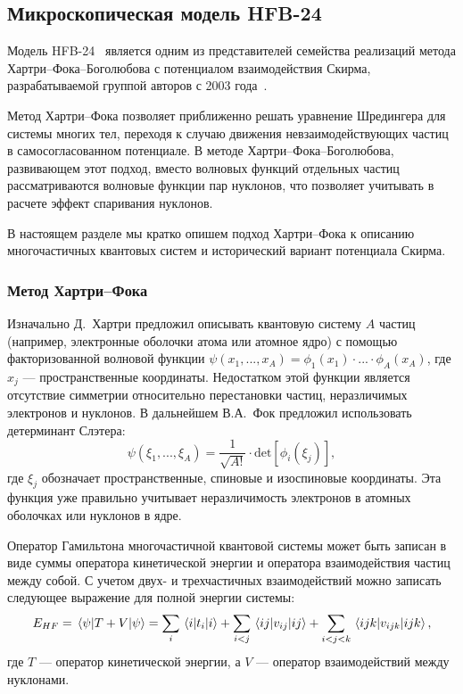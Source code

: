 \subsection{Микроскопическая модель HFB-24}
Модель HFB-24~\cite{goriely2013} является одним из представителей семейства реализаций метода Хартри--Фока--Боголюбова с потенциалом взаимодействия Скирма, разрабатываемой группой авторов с 2003 года~\cite{samyn2003}. 

Метод Хартри--Фока позволяет приближенно решать уравнение Шредингера для системы многих тел, переходя к случаю движения невзаимодействующих частиц в самосогласованном потенциале. В методе Хартри--Фока--Боголюбова, развивающем этот подход, вместо волновых функций отдельных частиц рассматриваются волновые функции пар нуклонов, что позволяет учитывать в расчете эффект спаривания нуклонов. 

В настоящем разделе мы кратко опишем подход Хартри--Фока к описанию многочастичных квантовых систем и исторический вариант потенциала Скирма.

\subsubsection{Метод Хартри--Фока}
Изначально Д.~Хартри предложил описывать квантовую систему $A$ частиц (например, электронные оболочки атома или атомное ядро) с помощью факторизованной волновой функции $\psi(x_1, ..., x_A) = \phi_1(x_1) \cdot ... \cdot \phi_A(x_A)$, где $x_j$ --- пространственные координаты. Недостатком этой функции является отсутствие симметрии относительно перестановки частиц, неразличимых электронов и нуклонов. В дальнейшем В.А.~Фок предложил использовать детерминант Слэтера:
\begin{equation}
\displaystyle
\psi(\xi_1, ..., \xi_A) = \frac{1}{\sqrt{A!}} \cdot \text{det} 
\left[ \phi_i (\xi_j) \right],
\end{equation}
где $\xi_j$ обозначает пространственные, спиновые и изоспиновые координаты. Эта функция уже правильно учитывает неразличимость электронов в атомных оболочках или нуклонов в ядре.

Оператор Гамильтона многочастичной квантовой системы может быть записан в виде суммы оператора кинетической энергии и оператора взаимодействия частиц между собой. С учетом двух- и трехчастичных взаимодействий можно записать следующее выражение для полной энергии системы:
\begin{equation}
E_{HF} = \expval{T + V}{\psi} = \sum_i \expval{t_i}{i} 
  + \sum_{i < j} \expval{v_{ij}}{ij}
  + \sum_{i < j < k} \expval{v_{ijk}}{ijk}, 
\label{eq:hs-energy}
\end{equation}
где $T$ --- оператор кинетической энергии, а $V$ --- оператор взаимодействий между нуклонами.


